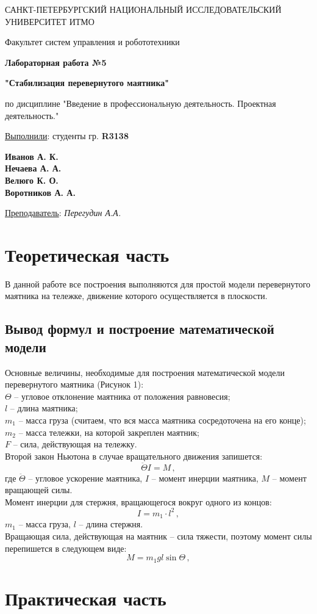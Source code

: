 \documentclass[a5paper, 10pt]{article}
\theoremstyle{definition}
\theoremstyle{plain}
\theoremstyle{remark}
\newcommand*{\titlePage}{
	\thispagestyle{title}
	\begingroup
	\begin{center}
		\vspace*{6ex}
		
		{\small
			САНКТ-ПЕТЕРБУРГСКИЙ НАЦИОНАЛЬНЫЙ ИССЛЕДОВАТЕЛЬСКИЙ УНИВЕРСИТЕТ ИТМО
		}
		
		\vspace*{2ex}
		
		{\normalsize
			Факультет систем управления и робототехники
		}
		
		\vspace*{15ex}
		
		{\Large \bfseries 
			Лабораторная работа  №5
		}

                     \vspace*{2ex}
{\Large \bfseries 
			"Стабилизация перевернутого маятника"
		}

                     \vspace*{2ex}
		
		{\normalsize
			по дисциплине "Введение в профессиональную деятельность. Проектная деятельность."
		}
                     \vspace*{2ex}
	\end{center}
	\vspace*{10ex}
	\begin{flushright}
		{\large 
			\underline{Выполнили}: студенты гр. \textbf{R3138}\\
			\begin{flushright}
				\textbf{Иванов А. К.}\\
                                           \textbf{Нечаева А. А.}\\
                                           \textbf{Велюго К. О.}\\
                                           \textbf{Воротников А. А.}\\
			\end{flushright}
		}
		
		\vspace*{5ex}
		
		{\large 
			\underline{Преподаватель}: \textit{Перегудин А.А.}
		}
	\end{flushright}	
	\newpage
	\setcounter{page}{2}
	\endgroup}
\begin{document}
	\titlePage
	\pagestyle{style}


\newpage
\section{Теоретическая часть}	
В данной работе все построения выполняются для простой модели перевернутого маятника на тележке, движение которого осуществляется в плоскости.

\subsection{Вывод формул и построение математической модели}	
Основные величины, необходимые для построения математической модели перевернутого маятника (Рисунок 1):\\
$\Theta $ -- угловое отклонение маятника от положения равновесия;\\
$l$ -- длина маятника;\\
$m_1$ -- масса груза (считаем, что вся масса маятника сосредоточена на его конце);\\
$m_2$ -- масса тележки, на которой закреплен маятник;\\
$F$ -- сила, действующая на тележку.\\
Второй закон Ньютона в случае вращательного движения запишется:
\begin{equation}
\ddot{\Theta}I = M \, ,
\end{equation}
где $\ddot{\Theta}$ -- угловое ускорение маятника, $I$ -- момент инерции маятника, $M$ -- момент вращающей силы.\\
Момент инерции для стержня, вращающегося вокруг одного из концов:
\begin{equation}
I = m_1 \cdot l^2 \, ,
\end{equation}
$m_1$ -- масса груза, $l$ -- длина стержня.\\
Вращающая сила, действующая на маятник -- сила тяжести, поэтому момент силы перепишется в следующем виде:
\begin{equation}
M = m_1 g l \sin \Theta \, ,
\end{equation}


\newpage
\section{Практическая часть}	
\end{document}
